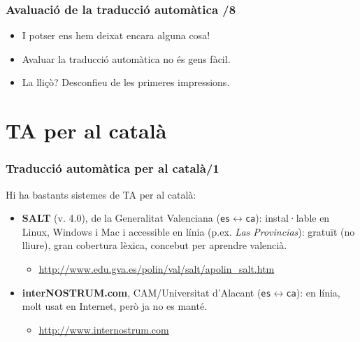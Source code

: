 \documentclass{beamer}
\newcommand{\Pair}[2]{\texttt{#1}\(\leftrightarrow\)\texttt{#2}}
\newcommand{\empha}[1]{\emph{#1}\/}
\begin{document}
\begin{frame}
  \frametitle{ Avaluació de la traducció automàtica /8}

{
  \begin{itemize}
  \item {I potser ens hem deixat encara alguna cosa!}
\pause

\item {Avaluar la traducció automàtica no és gens fàcil.}
\pause

\item {La lliçò? Desconfieu de les primeres impressions.}
  \end{itemize}

}
\end{frame}

\section{TA per al català}
\begin{frame}
  \frametitle{Traducció automàtica per al català/1}
Hi ha bastants sistemes de TA per al català:
\begin{itemize}
\item \textbf{SALT} (v. 4.0), de la Generalitat Valenciana
  (\Pair{es}{ca}): instal·lable en Linux, Windows i Mac i accessible
  en línia (p.ex. \empha{Las Provincias}): gratuït (no lliure), gran
  cobertura lèxica, concebut per aprendre valencià.
  \begin{itemize}
  \item \url{http://www.edu.gva.es/polin/val/salt/apolin_salt.htm}
  \end{itemize}
\item \textbf{interNOSTRUM.com}, CAM/Universitat d'Alacant (\Pair{es}{ca}): en línia, molt usat en Internet, però ja no es manté.
  \begin{itemize}
  \item \url{http://www.internostrum.com}
  \end{itemize}
\end{itemize}
\end{frame}
\end{document}
